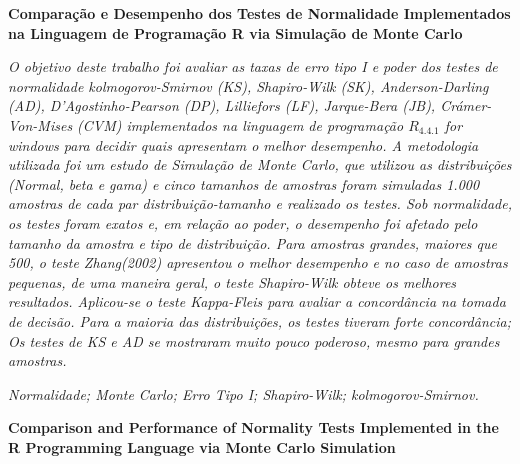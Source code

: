 \documentclass[a4paper,11pt]{article} %
\begin{document}
\pagestyle{fancy}
\setcounter{page}{1}
\renewcommand{\thefootnote}{$\dagger$}
\lfoot{}
\rfoot{}
\setpagewiselinenumbers
\modulolinenumbers[1]
\linenumbers

\begin{center}
    {\large {\bf Comparação e Desempenho dos Testes de Normalidade Implementados na Linguagem de Programação R via Simulação de Monte Carlo}}\vspace{0.3cm}
\end{center}

\begin{small}

 {\it 
    O objetivo deste trabalho foi avaliar as taxas de erro tipo I e poder dos testes de normalidade kolmogorov-Smirnov (KS), Shapiro-Wilk (SK), Anderson-Darling (AD), D’Agostinho-Pearson (DP), Lilliefors (LF), Jarque-Bera (JB), Crámer-Von-Mises (CVM) implementados na linguagem de programação $R_{4.4.1}$ for windows para decidir quais apresentam o melhor desempenho. A metodologia utilizada foi um estudo de Simulação de Monte Carlo, que utilizou as distribuições (Normal, beta e gama) e cinco tamanhos de amostras foram simuladas 1.000 amostras de cada par distribuição-tamanho e realizado os testes. Sob normalidade, os testes foram exatos e, em relação ao poder, o desempenho foi afetado pelo tamanho da amostra e tipo de distribuição. Para amostras grandes, maiores que 500, o teste \textit{Zhang(2002)} apresentou o melhor desempenho e no caso de amostras pequenas, de uma maneira geral, o teste Shapiro-Wilk obteve os melhores resultados. Aplicou-se o teste Kappa-Fleis para avaliar a concordância na tomada de decisão. Para a maioria das distribuições, os testes tiveram forte concordância; Os testes de KS e AD se mostraram muito pouco poderoso, mesmo para grandes amostras.}\vspace{0.3cm}

 {\it Normalidade; Monte Carlo; Erro Tipo I; Shapiro-Wilk; kolmogorov-Smirnov.}\vspace{0.3cm}

\end{small}

\begin{center}
    {\large {\bf Comparison and Performance of Normality Tests Implemented in the R Programming Language via Monte Carlo Simulation}\vspace{0.3cm}}
\end{center}
\end{document}
